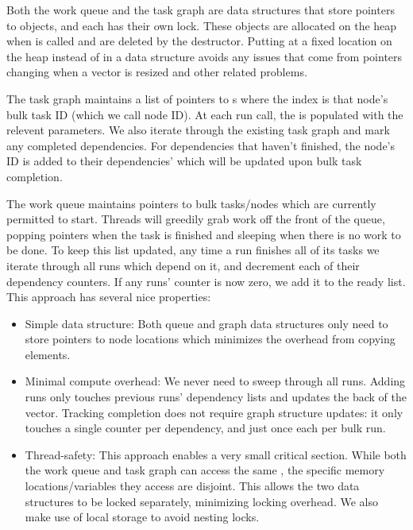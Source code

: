 \documentclass[11pt]{article}
\begin{document}
Both the work queue and the task graph are data structures that store pointers
to  objects, and each has their own lock. These objects are
allocated on the heap when  is called and are deleted by the
destructor. Putting at a fixed location on the heap instead of in a data
structure avoids any issues that come from pointers changing when a vector is
resized and other related problems.

\smallskip
The task graph maintains a list of pointers to s where the
index is that node's bulk task ID (which we call node ID). At each run call, the
 is populated with the relevent parameters. We also iterate
through the existing task graph and mark any completed dependencies. For
dependencies that haven't finished, the node's ID is added to their
dependencies'  which will be updated upon bulk task completion.

\smallskip
The work queue maintains pointers to bulk tasks/nodes which are currently
permitted to start. Threads will greedily grab work off the front of the queue,
popping pointers when the task is finished and sleeping when there is no work to
be done. To keep this list updated, any time a run finishes all of its tasks we
iterate through all runs which depend on it, and decrement each of their
dependency counters. If any runs' counter is now zero, we add it to the ready
list. This approach has several nice properties:

\begin{itemize}
    \item Simple data structure: Both queue and graph data structures only need
      to store pointers to node locations which minimizes the overhead from
      copying elements.
    \item Minimal compute overhead: We never need to sweep through all runs.
      Adding runs only touches previous runs' dependency lists and updates the
      back of the vector. Tracking completion does not require graph structure
      updates: it only touches a single counter per dependency, and just once
      each per bulk run.
    \item Thread-safety: This approach enables a very small critical section.
      While both the work queue and task graph can access the same
      , the specific memory locations/variables they access
      are disjoint. This allows the two data structures to be locked separately,
      minimizing locking overhead. We also make use of local storage to avoid
      nesting locks.
\end{itemize}
\end{document}
